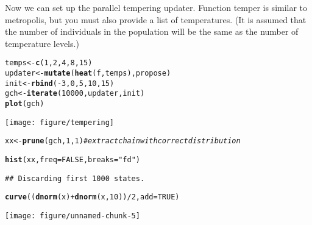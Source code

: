 \documentclass{article}\usepackage[]{graphicx}\usepackage[]{color}
\makeatletter
\def\maxwidth{ %
  \ifdim\Gin@nat@width>\linewidth
    \linewidth
  \else
    \Gin@nat@width
  \fi
}
\newcommand{\hlnum}[1]{\textcolor[rgb]{0.686,0.059,0.569}{#1}}%
\newcommand{\hlstr}[1]{\textcolor[rgb]{0.192,0.494,0.8}{#1}}%
\newcommand{\hlcom}[1]{\textcolor[rgb]{0.678,0.584,0.686}{\textit{#1}}}%
\newcommand{\hlopt}[1]{\textcolor[rgb]{0,0,0}{#1}}%
\newcommand{\hlstd}[1]{\textcolor[rgb]{0.345,0.345,0.345}{#1}}%
\newcommand{\hlkwb}[1]{\textcolor[rgb]{0.69,0.353,0.396}{#1}}%
\newcommand{\hlkwc}[1]{\textcolor[rgb]{0.333,0.667,0.333}{#1}}%
\newcommand{\hlkwd}[1]{\textcolor[rgb]{0.737,0.353,0.396}{\textbf{#1}}}%
\newenvironment{kframe}{%
 \def\at@end@of@kframe{}%
 \ifinner\ifhmode%
  \def\at@end@of@kframe{\end{minipage}}%
  \begin{minipage}{\columnwidth}%
 \fi\fi%
 \def\FrameCommand##1{\hskip\@totalleftmargin \hskip-\fboxsep
 \colorbox{shadecolor}{##1}\hskip-\fboxsep
     \hskip-\linewidth \hskip-\@totalleftmargin \hskip\columnwidth}%
 \MakeFramed {\advance\hsize-\width
   \@totalleftmargin\z@ \linewidth\hsize
   \@setminipage}}%
 {\par\unskip\endMakeFramed%
 \at@end@of@kframe}
\newenvironment{knitrout}{}{} %
\makeatother
\begin{document}
Now we can set up the parallel tempering updater. Function temper is similar to
metropolis, but you must also provide a list of temperatures. (It is
assumed that the number of individuals in the population will be the
same as the number of temperature levels.)
\begin{knitrout}
\color{fgcolor}\begin{kframe}
\begin{alltt}
\hlstd{temps} \hlkwb{<-} \hlkwd{c}\hlstd{(}\hlnum{1}\hlstd{,} \hlnum{2}\hlstd{,} \hlnum{4}\hlstd{,} \hlnum{8}\hlstd{,} \hlnum{15}\hlstd{)}
\hlstd{updater} \hlkwb{<-} \hlkwd{mutate}\hlstd{(}\hlkwd{heat}\hlstd{(f, temps), propose)}
\hlstd{init} \hlkwb{<-} \hlkwd{rbind}\hlstd{(}\hlopt{-}\hlnum{3}\hlstd{,} \hlnum{0}\hlstd{,} \hlnum{5}\hlstd{,} \hlnum{10}\hlstd{,} \hlnum{15}\hlstd{)}
\hlstd{gch} \hlkwb{<-} \hlkwd{iterate}\hlstd{(}\hlnum{10000}\hlstd{, updater, init)}
\hlkwd{plot}\hlstd{(gch)}
\end{alltt}
\end{kframe}
\texttt{[image: figure/tempering]} 
\begin{kframe}\begin{alltt}
\hlstd{xx} \hlkwb{<-} \hlkwd{prune}\hlstd{(gch,} \hlnum{1}\hlstd{,} \hlnum{1}\hlstd{)}  \hlcom{#extract chain with correct distribution}
\end{alltt}
\end{kframe}
\end{knitrout}

\begin{knitrout}
\color{fgcolor}\begin{kframe}
\begin{alltt}
\hlkwd{hist}\hlstd{(xx,} \hlkwc{freq} \hlstd{=} \hlnum{FALSE}\hlstd{,} \hlkwc{breaks} \hlstd{=} \hlstr{"fd"}\hlstd{)}
\end{alltt}
\begin{verbatim}
## Discarding first 1000 states.
\end{verbatim}
\begin{alltt}
\hlkwd{curve}\hlstd{((}\hlkwd{dnorm}\hlstd{(x)} \hlopt{+} \hlkwd{dnorm}\hlstd{(x,} \hlnum{10}\hlstd{))}\hlopt{/}\hlnum{2}\hlstd{,} \hlkwc{add} \hlstd{=} \hlnum{TRUE}\hlstd{)}
\end{alltt}
\end{kframe}
\texttt{[image: figure/unnamed-chunk-5]} 

\end{knitrout}
\end{document}
